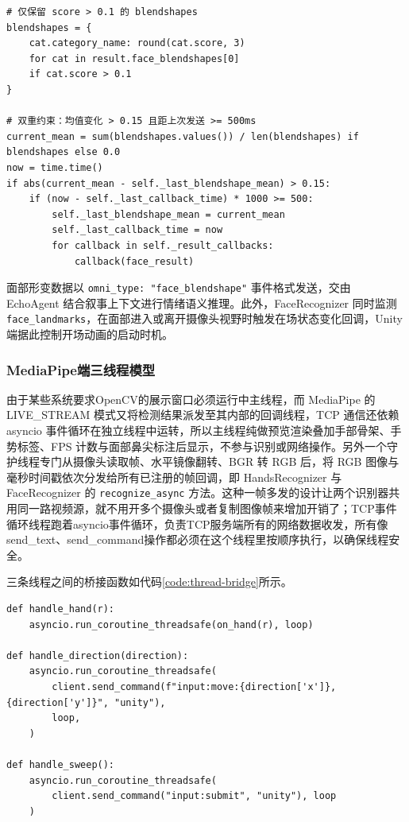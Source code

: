 \documentclass[bachelor]{njupthesis}
\begin{document}
\begin{code}
\caption{面部形变系数双重节流}
\label{code:face-throttle}
\lstset{style=codeblock}
\begin{lstlisting}
# 仅保留 score > 0.1 的 blendshapes
blendshapes = {
    cat.category_name: round(cat.score, 3)
    for cat in result.face_blendshapes[0]
    if cat.score > 0.1
}

# 双重约束：均值变化 > 0.15 且距上次发送 >= 500ms
current_mean = sum(blendshapes.values()) / len(blendshapes) if blendshapes else 0.0
now = time.time()
if abs(current_mean - self._last_blendshape_mean) > 0.15:
    if (now - self._last_callback_time) * 1000 >= 500:
        self._last_blendshape_mean = current_mean
        self._last_callback_time = now
        for callback in self._result_callbacks:
            callback(face_result)
\end{lstlisting}
\end{code}

面部形变数据以 \texttt{omni\_type: "face\_blendshape"} 事件格式发送，交由 EchoAgent 结合叙事上下文进行情绪语义推理。此外，FaceRecognizer 同时监测 \texttt{face\_landmarks}，在面部进入或离开摄像头视野时触发在场状态变化回调，Unity 端据此控制开场动画的启动时机。


\subsubsection{MediaPipe端三线程模型}
由于某些系统要求OpenCV的展示窗口必须运行中主线程，而 MediaPipe 的 LIVE\_STREAM 模式又将检测结果派发至其内部的回调线程，TCP 通信还依赖 asyncio 事件循环在独立线程中运转，所以主线程纯做预览渲染叠加手部骨架、手势标签、FPS 计数与面部鼻尖标注后显示，不参与识别或网络操作。另外一个守护线程专门从摄像头读取帧、水平镜像翻转、BGR 转 RGB 后，将 RGB 图像与毫秒时间戳依次分发给所有已注册的帧回调，即 HandsRecognizer 与 FaceRecognizer 的 \texttt{recognize\_async} 方法。这种一帧多发的设计让两个识别器共用同一路视频源，就不用开多个摄像头或者复制图像帧来增加开销了；TCP事件循环线程跑着asyncio事件循环，负责TCP服务端所有的网络数据收发，所有像send\_text、send\_command操作都必须在这个线程里按顺序执行，以确保线程安全。

三条线程之间的桥接函数如代码\ref{code:thread-bridge}所示。

\begin{code}
\caption{从 MediaPipe 回调到 TCP 事件循环的跨线程桥接}
\label{code:thread-bridge}
\lstset{style=codeblock}
\begin{lstlisting}
def handle_hand(r):
    asyncio.run_coroutine_threadsafe(on_hand(r), loop)

def handle_direction(direction):
    asyncio.run_coroutine_threadsafe(
        client.send_command(f"input:move:{direction['x']},{direction['y']}", "unity"),
        loop,
    )

def handle_sweep():
    asyncio.run_coroutine_threadsafe(
        client.send_command("input:submit", "unity"), loop
    )
\end{lstlisting}
\end{code}
\end{document}
